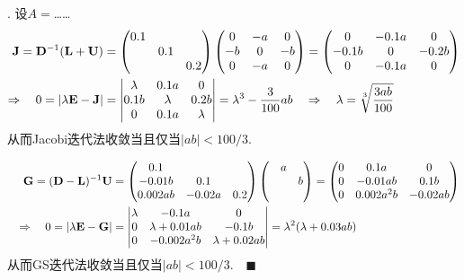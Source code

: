 \vspace{1cm}
\par{}. 设$A=$……
\ans
  \[\begin{split}
    \mathbf{J} = \mathbf{D}^{-1}(\mathbf{L}+\mathbf{U}) &=
    \begin{pmatrix}
      0.1 & & \\
      & 0.1 & \\
      && 0.2
    \end{pmatrix}
    \begin{pmatrix}
      0 & -a & 0 \\
      -b & 0 & -b \\
      0 & -a & 0
    \end{pmatrix} =
    \begin{pmatrix}
      0 & -0.1a & 0 \\
      -0.1b & 0 & -0.2b \\
      0 & -0.1a & 0
    \end{pmatrix}\\
    \Rightarrow\quad
    0 = |\lambda\mathbf{E} - \mathbf{J}| &=
    \begin{vmatrix}
        \lambda & 0.1a & 0 \\
        0.1b & \lambda & 0.2b \\
        0 & 0.1a & \lambda
    \end{vmatrix} =
    \lambda^3 - \frac{3}{100}ab \quad\Rightarrow\quad
    \lambda = \sqrt[3]{\frac{3ab}{100}}
  \end{split}\]
  从而Jacobi迭代法收敛当且仅当$|ab| < 100/3$.\par
  \[\begin{split}
    \mathbf{G} = (\mathbf{D}-\mathbf{L})^{-1}\mathbf{U} &=
    \begin{pmatrix}
      0.1 & & \\
      -0.01b & 0.1 & \\
      0.002ab& -0.02a & 0.2
    \end{pmatrix}
    \begin{pmatrix}
      & a & \\
      &  & b\\
      & &
     \end{pmatrix} =
     \begin{pmatrix}
        0 & 0.1a & 0 \\
        0 & -0.01ab & 0.1b \\
        0 & 0.002a^2b & -0.02ab
     \end{pmatrix} \\ \quad\Rightarrow\quad
     0 = |\lambda\mathbf{E}-\mathbf{G}| &=
     \begin{vmatrix}
       \lambda & -0.1a & 0 \\
       0 & \lambda + 0.01ab & -0.1b \\
       0 & -0.002a^2b & \lambda + 0.02ab
     \end{vmatrix} = \lambda^2(\lambda+0.03ab)
  \end{split}\]
  从而GS迭代法收敛当且仅当$|ab|<100/3.\quad\blacksquare$

